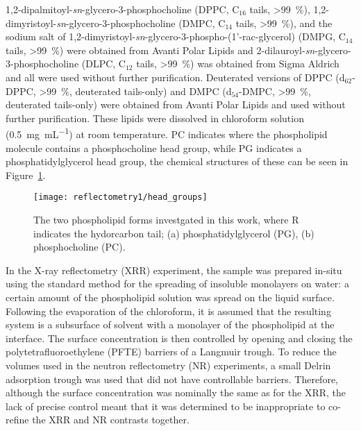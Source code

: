 1,2-dipalmitoyl-\emph{sn}-glycero-3-phosphocholine (DPPC, C$_{16}$ tails, \SI{>99}{\percent}), 1,2-dimyristoyl-\emph{sn}-glycero-3-phosphocholine (DMPC, C$_{14}$ tails, \SI{>99}{\percent}), and the sodium salt of 1,2-dimyristoyl-\emph{sn}-glycero-3-phospho-(1'-rac-glycerol) (DMPG, C$_{14}$ tails, \SI{>99}{\percent}) were obtained from Avanti Polar Lipids and 2-dilauroyl-\emph{sn}-glycero-3-phosphocholine (DLPC, C$_{12}$ tails, \SI{>99}{\percent}) was obtained from Sigma Aldrich and all were used without further purification. Deuterated versions of DPPC (d$_{62}$-DPPC, \SI{>99}{\percent}, deuterated tails-only) and DMPC (d$_{54}$-DMPC, \SI{>99}{\percent}, deuterated tails-only) were obtained from Avanti Polar Lipids and used without further purification.
These lipids were dissolved in chloroform solution (\SI{0.5}{\milli\gram\per\milli\liter}) at room temperature.
PC indicates where the phospholipid molecule contains a phosphocholine head group, while PG indicates a phosphatidylglycerol head group, the chemical structures of these can be seen in Figure~\ref{fig:heads}.
%
\begin{figure}
    \centering
    \texttt{[image: reflectometry1/head\_groups]}
    \caption{The two phospholipid forms investgated in this work, where R indicates the hydorcarbon tail; (a) phosphatidylglycerol (PG), (b) phosphocholine (PC).}
    \label{fig:heads}
\end{figure}
%

In the X-ray reflectometry (XRR) experiment, the sample was prepared in-situ using the standard method for the spreading of insoluble monolayers on water: a certain amount of the phospholipid solution was spread on the liquid surface.
Following the evaporation of the chloroform, it is assumed that the resulting system is a subsurface of solvent with a monolayer of the phospholipid at the interface.
The surface concentration is then controlled by opening and closing the polytetrafluoroethylene (PFTE) barriers of a Langmuir trough.
To reduce the volumes used in the neutron reflectometry (NR) experiments, a small Delrin adsorption trough was used that did not have controllable barriers.
Therefore, although the surface concentration was nominally the same as for the XRR, the lack of precise control meant that it was determined to be inappropriate to co-refine the XRR and NR contrasts together.

